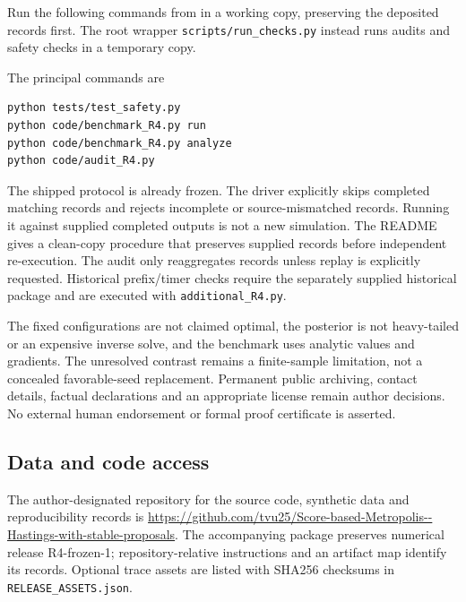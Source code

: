 \documentclass[11pt]{article}
\theoremstyle{definition}\newtheorem{definition}[theorem]{Definition}
\theoremstyle{remark}\newtheorem{remark}[theorem]{Remark}
\numberwithin{equation}{section}
\newcommand{\1}{\mathbf 1}
\begin{document}
Run the following commands from  in a working copy, preserving the deposited records first. The root wrapper \texttt{scripts/run\_checks.py} instead runs audits and safety checks in a temporary copy.

The principal commands are
\begin{verbatim}
python tests/test_safety.py
python code/benchmark_R4.py run
python code/benchmark_R4.py analyze
python code/audit_R4.py
\end{verbatim}
The shipped protocol is already frozen. The driver explicitly skips completed matching records and rejects incomplete or source-mismatched records. Running it against supplied completed outputs is not a new simulation. The README gives a clean-copy procedure that preserves supplied records before independent re-execution. The audit only reaggregates records unless replay is explicitly requested. Historical prefix/timer checks require the separately supplied historical package and are executed with \texttt{additional\_R4.py}.

The fixed configurations are not claimed optimal, the posterior is not heavy-tailed or an expensive inverse solve, and the benchmark uses analytic values and gradients. The unresolved contrast remains a finite-sample limitation, not a concealed favorable-seed replacement. Permanent public archiving, contact details, factual declarations and an appropriate license remain author decisions. No external human endorsement or formal proof certificate is asserted.

\subsection*{Data and code access}
The author-designated repository for the source code, synthetic data and reproducibility records is
{\def\UrlBreaks{\do\/\do-\do.}\url{https://github.com/tvu25/Score-based-Metropolis--Hastings-with-stable-proposals}}. 
The accompanying package preserves numerical release R4-frozen-1; repository-relative instructions and an artifact map identify its records. Optional trace assets are listed with SHA256 checksums in \texttt{RELEASE\_ASSETS.json}. 
\end{document}
